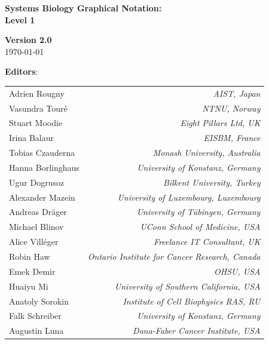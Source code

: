 \begin{titlepage}

\vspace*{0.75in}

\begin{center}

\textbf{\sffamily\bfseries\huge
Systems Biology Graphical Notation:\\[0.3em]
\PDl Level 1}

\vspace*{0.5in}

\Large
\textbf{Version 2.0}\\[0.1in]

\large
\today\\[0.25in]

\vspace{0.5in}

\textbf{\sffamily Editors}:\\[7pt]

\begin{tabular}{l>{\hspace*{15pt}}r}
Adrien Rougny   & \emph{AIST, Japan}\\
Vasundra Touré   & \emph{NTNU, Norway}\\
Stuart Moodie   & \emph{Eight Pillars Ltd, UK}\\
Irina Balaur & \emph{EISBM, France}\\
Tobias Czauderna   & \emph{Monash University, Australia}\\
Hanna Borlinghaus & \emph{University of Konstanz, Germany}\\
Ugur Dogrusoz   & \emph{Bilkent University, Turkey}\\
Alexander Mazein   & \emph{University of Luxembourg, Luxembourg}\\
Andreas Dräger   & \emph{University of Tübingen, Germany}\\
Michael Blinov & \emph{UConn School of Medicine, USA}\\
Alice Vill\'{e}ger   & \emph{Freelance IT Consultant, UK}\\
Robin Haw   & \emph{Ontario Institute for Cancer Research, Canada}\\
Emek Demir    & \emph{OHSU, USA}\\
Huaiyu Mi	& \emph{University of Southern California, USA}\\
Anatoly Sorokin   & \emph{Institute of Cell Biophysics RAS, RU}\\ 
Falk Schreiber	 & \emph{University of Konstanz, Germany}\\
Augustin Luna   & \emph{Dana-Faber Cancer Institute, USA}\\
\end{tabular}


\end{center}
\end{titlepage}
